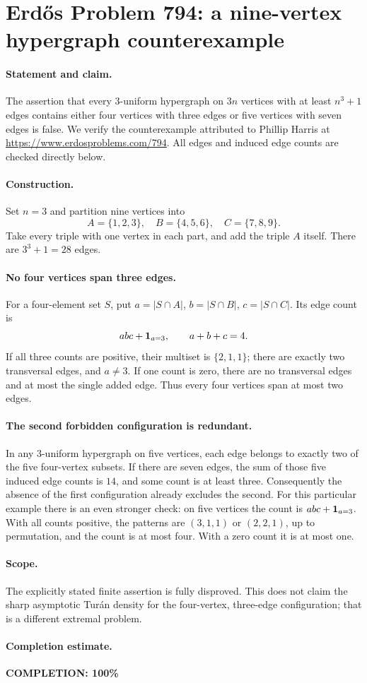 \section*{Erd\H{o}s Problem 794: a nine-vertex hypergraph counterexample}

\paragraph{Statement and claim.}
The assertion that every \(3\)-uniform hypergraph on \(3n\)
vertices with at least \(n^3+1\) edges contains either four
vertices with three edges or five vertices with seven edges
is false. We verify the counterexample attributed to
Phillip Harris at \url{https://www.erdosproblems.com/794}.
All edges and induced edge counts are checked directly below.

\paragraph{Construction.}
Set \(n=3\) and partition nine vertices into
\[
 A=\{1,2,3\},\quad B=\{4,5,6\},\quad C=\{7,8,9\}.
\]
Take every triple with one vertex in each part, and add
the triple \(A\) itself. There are \(3^3+1=28\) edges.

\paragraph{No four vertices span three edges.}
For a four-element set \(S\), put
\(a=|S\cap A|\), \(b=|S\cap B|\), \(c=|S\cap C|\).
Its edge count is
\[
 abc+{\bf1}_{a=3},\qquad a+b+c=4.
\]
If all three counts are positive, their multiset is
\(\{2,1,1\}\); there are exactly two transversal edges,
and \(a\ne3\).
If one count is zero, there are no transversal edges
and at most the single added edge.
Thus every four vertices span at most two edges.

\paragraph{The second forbidden configuration is redundant.}
In any \(3\)-uniform hypergraph on five vertices, each edge
belongs to exactly two of the five four-vertex subsets.
If there are seven edges, the sum of those five induced
edge counts is \(14\), and some count is at least three.
Consequently the absence of the first configuration already
excludes the second.
For this particular example there is an even stronger check:
on five vertices the count is \(abc+{\bf1}_{a=3}\).
With all counts positive, the patterns are \((3,1,1)\)
or \((2,2,1)\), up to permutation, and the count is at
most four. With a zero count it is at most one.

\paragraph{Scope.}
The explicitly stated finite assertion is fully disproved.
This does not claim the sharp asymptotic Tur\'an density
for the four-vertex, three-edge configuration; that is
a different extremal problem.

\paragraph{Completion estimate.}
\textbf{COMPLETION: 100\%}
